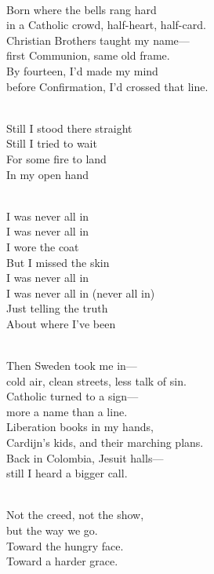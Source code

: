 \begin{lyrics}
\\
Born where the bells rang hard\\
in a Catholic crowd, half-heart, half-card.\\
Christian Brothers taught my name—\\
first Communion, same old frame.\\
By fourteen, I’d made my mind\\
before Confirmation, I’d crossed that line.

\\
Still I stood there straight\\
Still I tried to wait\\
For some fire to land\\
In my open hand

\\
I was never all in\\
I was never all in\\
I wore the coat\\
But I missed the skin\\
I was never all in\\
I was never all in
(never all in)\\
Just telling the truth\\
About where I’ve been

\\
Then Sweden took me in—\\
cold air, clean streets, less talk of sin.\\
Catholic turned to a sign—\\
more a name than a line.\\
Liberation books in my hands,\\
Cardijn’s kids, and their marching plans.\\
Back in Colombia, Jesuit halls—\\
still I heard a bigger call.

\\
Not the creed, not the show,\\
but the way we go.\\
Toward the hungry face.\\
Toward a harder grace.


\end{lyrics}
